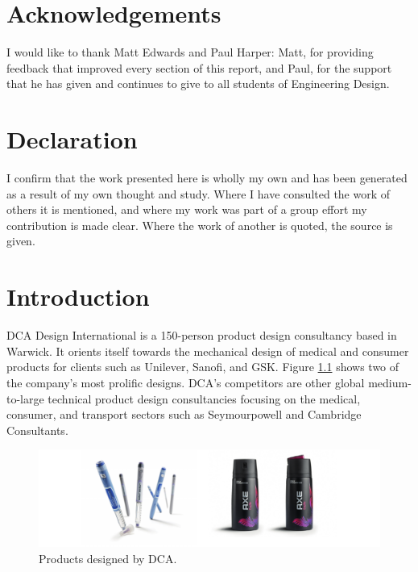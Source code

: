 \documentclass[11pt,a4paper,article]{memoir} %
\begin{document}
\newpage
\chapter*{\large Acknowledgements}
\vspace*{-2\baselineskip}
I would like to thank Matt Edwards and Paul Harper: Matt, for providing feedback that improved every section of this report, and Paul, for the support that he has given and continues to give to all students of Engineering Design.\\


\chapter*{\large Declaration}
\vspace*{-2\baselineskip}
I confirm that the work presented here is wholly my own and has been generated as a result of my own thought and study. Where I have consulted the work of others it is mentioned, and where my work was part of a group effort my contribution is made clear. Where the work of another is quoted, the source is given.

\newpage
\chapter{Introduction}
DCA Design International is a 150-person product design consultancy based in Warwick. It orients itself towards the mechanical design of medical and consumer products for clients such as Unilever, Sanofi, and GSK. Figure \ref{fig:dca_profile} shows two of the company's most prolific designs. DCA's competitors are other global medium-to-large technical product design consultancies focusing on the medical, consumer, and transport sectors such as Seymourpowell and Cambridge Consultants.
\begin{figure}[h!]
\includegraphics[width=\textwidth]{DCA_profile.pdf}
\caption{Products designed by DCA.}
\label{fig:dca_profile}
\end{figure}
\vspace{-14pt}
\end{document}
